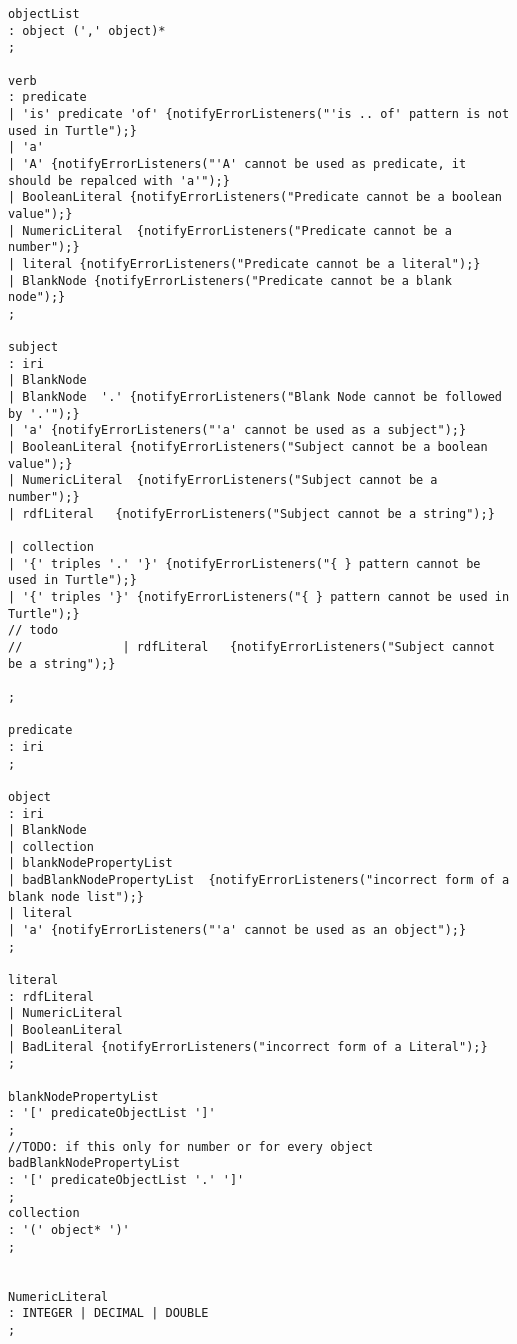 \begin{lstlisting}[breaklines,basicstyle=\ttfamily]
objectList
: object (',' object)*
;

verb
: predicate
| 'is' predicate 'of' {notifyErrorListeners("'is .. of' pattern is not used in Turtle");}
| 'a'
| 'A' {notifyErrorListeners("'A' cannot be used as predicate, it should be repalced with 'a'");}
| BooleanLiteral {notifyErrorListeners("Predicate cannot be a boolean value");}
| NumericLiteral  {notifyErrorListeners("Predicate cannot be a number");}
| literal {notifyErrorListeners("Predicate cannot be a literal");}
| BlankNode {notifyErrorListeners("Predicate cannot be a blank node");}
;

subject
: iri
| BlankNode
| BlankNode  '.' {notifyErrorListeners("Blank Node cannot be followed by '.'");}
| 'a' {notifyErrorListeners("'a' cannot be used as a subject");}
| BooleanLiteral {notifyErrorListeners("Subject cannot be a boolean value");}
| NumericLiteral  {notifyErrorListeners("Subject cannot be a number");}
| rdfLiteral   {notifyErrorListeners("Subject cannot be a string");}

| collection
| '{' triples '.' '}' {notifyErrorListeners("{ } pattern cannot be used in Turtle");}
| '{' triples '}' {notifyErrorListeners("{ } pattern cannot be used in Turtle");} 
// todo
//				| rdfLiteral   {notifyErrorListeners("Subject cannot be a string");}

;

predicate
: iri
;

object
: iri
| BlankNode
| collection
| blankNodePropertyList
| badBlankNodePropertyList  {notifyErrorListeners("incorrect form of a blank node list");}
| literal
| 'a' {notifyErrorListeners("'a' cannot be used as an object");}
;

literal
: rdfLiteral
| NumericLiteral
| BooleanLiteral
| BadLiteral {notifyErrorListeners("incorrect form of a Literal");}
;

blankNodePropertyList
: '[' predicateObjectList ']'
;
//TODO: if this only for number or for every object
badBlankNodePropertyList   
: '[' predicateObjectList '.' ']'
;
collection
: '(' object* ')'
;


NumericLiteral
: INTEGER | DECIMAL | DOUBLE
;


\end{lstlisting}
